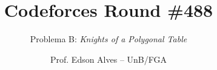 \title{Codeforces Round \#488}
\subtitle{Problema B: \textit{Knights of a Polygonal Table}}
\author{Prof. Edson Alves -- UnB/FGA}
\date{}
